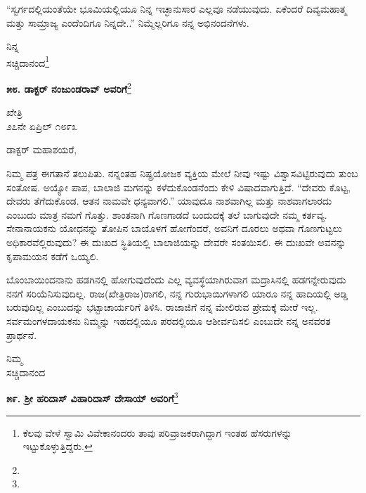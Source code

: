 “ಸ್ವರ್ಗದಲ್ಲಿಯಂತೆಯೇ ಭೂಮಿಯಲ್ಲಿಯೂ ನಿನ್ನ ಇಚ್ಛಾನುಸಾರ ಎಲ್ಲವೂ ನಡೆಯುವುದು. ಏಕೆಂದರೆ ದಿವ್ಯಮಹಾತ್ಮ ಮತ್ತು ಸಾಮ್ರಾಜ್ಯ ಎಂದೆಂದಿಗೂ ನಿನ್ನದೇ..” ನಿಮ್ಮೆಲ್ಲರಿಗೂ ನನ್ನ ಅಭಿನಂದನೆಗಳು.

\vspace{-0.45cm}

{\flushright
ನಿನ್ನ\\ಸಚ್ಚಿದಾನಂದ\footnote{ಕೆಲವು ವೇಳೆ ಸ್ವಾಮಿ ವಿವೇಕಾನಂದರು ತಾವು ಪರಿವ್ರಾಜಕರಾಗಿದ್ದಾಗ ಇಂತಹ ಹೆಸರುಗಳನ್ನು ಇಟ್ಟುಕೊಳ್ಳುತ್ತಿದ್ದರು.}\par}

\begin{center}
\textbf{೫೮. ಡಾಕ್ಟರ್ ನಂಜುಂಡರಾವ್ ಅವರಿಗೆ}\footnote{}
\end{center}

\vspace{-0.45cm}

\begin{flushright}
ಖೇತ್ರಿ\\೨೭ನೇ ಏಪ್ರಿಲ್ ೧೮೯೩
\end{flushright}

\noindent
ಡಾಕ್ಟರ್ ಮಹಾಶಯರೆ,

ನಿಮ್ಮ ಪತ್ರ ಈಗತಾನೆ ತಲುಪಿತು. ನನ್ನಂತಹ ನಿಷ್ಪ್ರಯೋಜಕ ವ್ಯಕ್ತಿಯ ಮೇಲೆ ನೀವು ಇಷ್ಟು ವಿಶ್ವಾಸವಿಟ್ಟಿರುವುದು ತುಂಬ ಸಂತೋಷ. ಅಯ್ಯೋ ಪಾಪ, ಬಾಲಾಜಿ ಮಗನನ್ನು ಕಳೆದುಕೊಂಡನೆಂದು ಕೇಳಿ ವಿಷಾದವಾಗುತ್ತಿದೆ. “ದೇವರು ಕೊಟ್ಟ, ದೇವರು ತೆಗೆದುಕೊಂಡ. ಆತನ ನಾಮವೇ ಧನ್ಯವಾಗಲಿ.” ಯಾವುದೂ ನಾಶವಾಗಿಲ್ಲ ಮತ್ತು ನಾಶವಾಗಲಾರದು ಎಂಬುದು ಮಾತ್ರ ನಮಗೆ ಗೊತ್ತು. ಶಾಂತನಾಗಿ ಗೊಣಗಾಡದೆ ಬಂದುದಕ್ಕೆ ತಲೆ ಬಾಗುವುದೇ ನಮ್ಮ ಕರ್ತವ್ಯ. ಸೇನಾನಾಯಕನು ಯೋಧನನ್ನು ತೋಪಿನ ಬಾಯೊಳಗೆ ಹೋಗೆಂದರೆ, ಅವನಿಗೆ ದೂರಲು ಅಥವಾ ಗೊಣಗುಟ್ಟಲು ಅಧಿಕಾರವೆಲ್ಲಿರುವುದು? ಈ ದುಃಖದ ಸ್ಥಿತಿಯಲ್ಲಿ ಬಾಲಾಜಿಯನ್ನು ದೇವರೇ ಸಂತಯಿಸಲಿ. ಈ ದುಃಖವೇ ಅವನನ್ನು ಕೃಪಾಮಯನ ಕಡೆಗೆ ಒಯ್ಯಲಿ.

ಬೊಂಬಾಯಿಂದನಾನು ಹಡಗಿನಲ್ಲಿ ಹೋಗುವುದೆಂದು ಎಲ್ಲ ವ್ಯವಸ್ಥೆಯಾಗಿರುವಾಗ ಮದ್ರಾಸಿನಲ್ಲಿ ಹಡಗನ್ನೇರುವುದು ನನಗೆ ಸರಿಯೆನಿಸುವುದಿಲ್ಲ. ರಾಜ(ಖೇತ್ರಿರಾಜ)ರಾಗಲಿ, ನನ್ನ ಗುರುಭಾಯಿಗಳಾಗಲಿ ಯಾರೂ ನನ್ನ ಹಾದಿಯಲ್ಲಿ ಅಡ್ಡಿ ಬರುವುದಿಲ್ಲ ಎಂಬುದನ್ನು ಭಟ್ಟಾಚಾರ್ಯರಿಗೆ ತಿಳಿಸಿ. ರಾಜಾಜಿಗೆ ನನ್ನ ಮೇಲಿರುವ ಪ್ರೇಮಕ್ಕೆ ಮೇರೆ ಇಲ್ಲ. ಸರ್ವಮಂಗಳದಾಯಕನು ನಿಮ್ಮನ್ನು ಇಹದಲ್ಲಿಯೂ ಪರದಲ್ಲಿಯೂ ಆಶೀರ್ವದಿಸಲಿ ಎಂಬುದೇ ನನ್ನ ಅನವರತ ಪ್ರಾರ್ಥನೆ.

\vspace{-0.45cm}

{\flushright
ನಿಮ್ಮ\\ಸಚ್ಚಿದಾನಂದ\par}

\begin{center}
\textbf{೫೯. ಶ‍್ರೀ ಹರಿದಾಸ್ ವಿಹಾರಿದಾಸ್‌ ದೇಸಾಯ್ ಅವರಿಗೆ}\footnote{}
\end{center}

